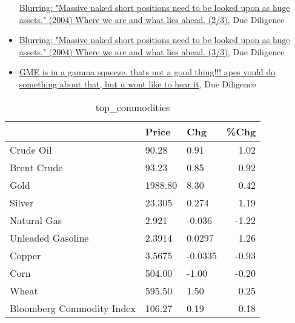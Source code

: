\documentclass{article}%
\begin{document}
\begin{itemize}
\href{https://reddit.com/r/Superstonk/comments/17c9l53/blurring\_massive\_naked\_short\_positions\_need\_to\_be/}{Blurring: "Massive naked short positions need to be looked upon as huge assets." (2004) Where we are and what lies ahead. (2/3)}, Due Diligence%
\item%
\href{https://reddit.com/r/Superstonk/comments/17c9kyh/blurring\_massive\_naked\_short\_positions\_need\_to\_be/}{Blurring: "Massive naked short positions need to be looked upon as huge assets." (2004) Where we are and what lies ahead. (3/3)}, Due Diligence%
\item%
\href{https://reddit.com/r/Superstonk/comments/17c6i5x/gme\_is\_in\_a\_gamma\_squeeze\_thats\_not\_a\_good\_thing/}{GME is in a gamma squeeze. thats not a good thing!!! apes vould do something about that, but u wont like to hear it}, Due Diligence%
\end{itemize}%


\begin{table}[htbp]%
\caption{top\_commodities}%
\centering%
\begin{adjustbox}{width=1\textwidth}%
\begin{tabular}{lllr}
\toprule
                          &   Price &     Chg &  \%Chg \\
\midrule
               Crude Oil  &   90.28 &    0.91 &  1.02 \\
             Brent Crude  &   93.23 &    0.85 &  0.92 \\
                    Gold  & 1988.80 &    8.30 &  0.42 \\
                  Silver  &  23.305 &   0.274 &  1.19 \\
             Natural Gas  &   2.921 &  -0.036 & -1.22 \\
       Unleaded Gasoline  &  2.3914 &  0.0297 &  1.26 \\
                  Copper  &  3.5675 & -0.0335 & -0.93 \\
                    Corn  &  504.00 &   -1.00 & -0.20 \\
                   Wheat  &  595.50 &    1.50 &  0.25 \\
Bloomberg Commodity Index &  106.27 &    0.19 &  0.18 \\
\bottomrule
\end{tabular}
%
\end{adjustbox}%
\end{table}

%
\end{document}
